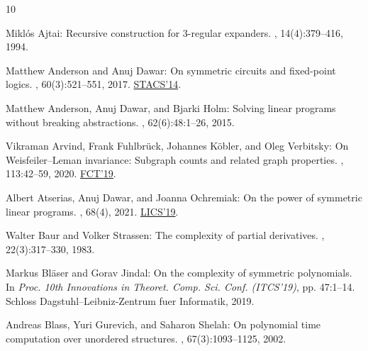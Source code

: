 \documentclass[11pt]{article}
\begin{document}
\tocrefpdfbookmark
\begin{thebibliography}{10}

{\sc Mikl{\'o}s Ajtai}: Recursive construction for 3-regular expanders.
, 14(4):379--416, 1994.
\newblock [\epfmtdoi{10.1007/BF01302963}]

{\sc Matthew Anderson and Anuj Dawar}: On symmetric circuits and fixed-point
  logics.
, 60(3):521--551, 2017.
\newblock \prelim
  \href{https://doi.org/10.4230/LIPIcs.STACS.2014.41}{STACS'14}.
\newblock [\epfmtdoi{10.1007/s00224-016-9692-2}]

{\sc Matthew Anderson, Anuj Dawar, and Bjarki Holm}: Solving linear programs
  without breaking abstractions.
, 62(6):48:1--26, 2015.
\newblock [\epfmtdoi{10.1145/2822890}]

{\sc Vikraman Arvind, Frank Fuhlbr{\"u}ck, Johannes K{\"o}bler, and Oleg
  Verbitsky}: On {W}eisfeiler--{L}eman invariance: {S}ubgraph counts and
  related graph properties.
, 113:42--59, 2020.
\newblock \prelim \href{https://doi.org/10.1007/978-3-030-25027-0\_8}{FCT'19}.

{\sc Albert Atserias, Anuj Dawar, and Joanna Ochremiak}: On the power of
  symmetric linear programs.
, 68(4), 2021.
\newblock \prelim \href{https://doi.org/10.1109/LICS.2019.8785792}{LICS'19}.
\newblock [\epfmtdoi{10.1145/3456297}]

{\sc Walter Baur and Volker Strassen}: The complexity of partial derivatives.
, 22(3):317--330, 1983.
\newblock [\epfmtdoi{10.1016/0304-3975(83)90110-X}]

{\sc Markus Bl{\"a}ser and Gorav Jindal}: On the complexity of symmetric
  polynomials.
\newblock In {\em Proc. 10th Innovations in Theoret. Comp. Sci. Conf.
  (ITCS'19)}, pp. 47:1--14. Schloss Dagstuhl--Leibniz-Zentrum fuer Informatik,
  2019.

{\sc Andreas Blass, Yuri Gurevich, and Saharon Shelah}: On polynomial time
  computation over unordered structures.
, 67(3):1093--1125, 2002.


\end{thebibliography}
\end{document}
